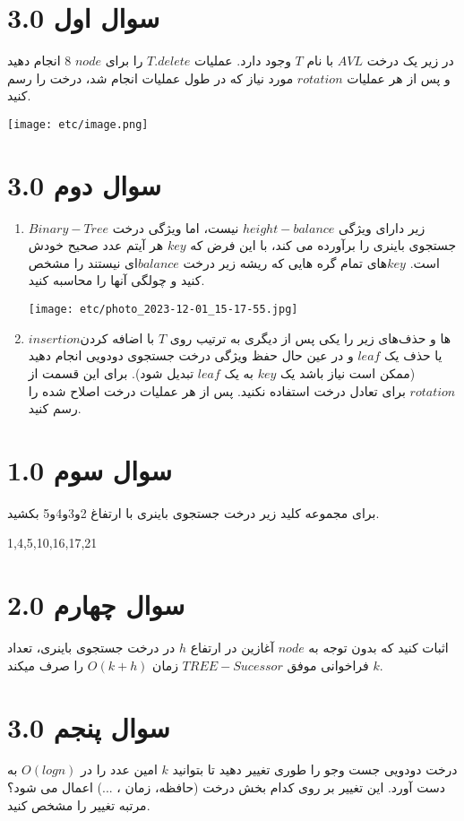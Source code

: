 \documentclass[12pt]{article}
\begin{document}
\fontsize{12pt}{14pt}\selectfont



\section{سوال اول 3.0}
در زیر یک درخت $AVL$ با نام $T$ وجود دارد. عملیات $T.delete$ را برای $node$ 8 انجام دهید و پس از هر عملیات $rotation$ مورد نیاز که در طول عملیات انجام شد، درخت را رسم کنید.

\texttt{[image: etc/image.png]}

\section{سوال دوم 3.0}
\begin{enumerate}
    \item $Binary-Tree$ زیر دارای ویژگی $height-balance$ نیست، اما ویژگی درخت جستجوی باینری را برآورده می کند، با این فرض که $key$ هر آیتم عدد صحیح خودش است. $key$های تمام گره هایی که ریشه زیر درخت $balance$ای نیستند را مشخص کنید و چولگی آنها را محاسبه کنید.
    
    \texttt{[image: etc/photo\_2023-12-01\_15-17-55.jpg]}

    \item $insertion$ها و حذف‌های زیر را یکی پس از دیگری به ترتیب روی $T$ با اضافه کردن یا حذف یک $leaf$ و در عین حال حفظ ویژگی درخت جستجوی دودویی انجام دهید (ممکن است نیاز باشد یک $key$ به یک $leaf$ تبدیل شود).
    برای این قسمت از $rotation$ برای تعادل درخت استفاده نکنید. پس از هر عملیات درخت اصلاح شده را رسم کنید.
\end{enumerate}


\section{سوال سوم 1.0}
برای مجموعه کلید زیر درخت جستجوی باینری با ارتفاغ 2و3و4و5 بکشید.

{1,4,5,10,16,17,21}



\section{سوال چهارم 2.0}
اثبات کنید که بدون توجه به $node$ آغازین در ارتفاع $h$ در درخت جستجوی باینری، تعداد $k$ فراخوانی موفق $TREE-Sucessor$ زمان $O(k+h)$ را صرف میکند.

\section{سوال پنجم 3.0}
درخت دودویی جست وجو را طوری تغییر دهید تا بتوانید $k$ امین عدد را در $O(logn)$ به دست آورد. این تغییر بر روی کدام بخش درخت (حافظه، زمان ، ...) اعمال می شود؟ مرتبه تغییر را مشخص کنید.
\end{document}
